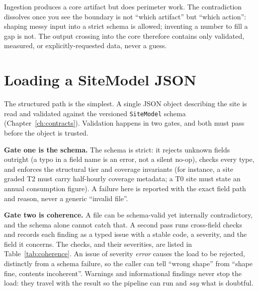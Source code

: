\begin{keyidea}
Ingestion produces a core artifact but does perimeter work. The contradiction dissolves once you see the boundary is not ``which artifact'' but ``which action'': shaping messy input into a strict schema is allowed; inventing a number to fill a gap is not. The output crossing into the core therefore contains only validated, measured, or explicitly-requested data, never a guess.
\end{keyidea}

\section{Loading a SiteModel JSON}

The structured path is the simplest. A single JSON object describing the site is read and validated against the versioned \texttt{SiteModel} schema (Chapter~\ref{ch:contracts}). Validation happens in two gates, and both must pass before the object is trusted.

\textbf{Gate one is the schema.} The schema is strict: it rejects unknown fields outright (a typo in a field name is an error, not a silent no-op), checks every type, and enforces the structural tier and coverage invariants (for instance, a site graded T2 must carry half-hourly coverage metadata; a T0 site must state an annual consumption figure). A failure here is reported with the exact field path and reason, never a generic ``invalid file''.

\textbf{Gate two is coherence.} A file can be schema-valid yet internally contradictory, and the schema alone cannot catch that. A second pass runs cross-field checks and records each finding as a typed issue with a stable code, a severity, and the field it concerns. The checks, and their severities, are listed in Table~\ref{tab:coherence}. An issue of severity \emph{error} causes the load to be rejected, distinctly from a schema failure, so the caller can tell ``wrong shape'' from ``shape fine, contents incoherent''. Warnings and informational findings never stop the load: they travel with the result so the pipeline can run and \emph{say} what is doubtful.

